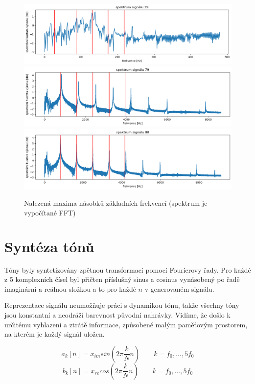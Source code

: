 \documentclass[a4paper, 12pt]{article}
\begin{document}
	\begin{figure}[H]
		\includegraphics[width=\textwidth]{src/base_a.png}
		\includegraphics[width=\textwidth]{src/base_b.png}
		\includegraphics[width=\textwidth]{src/base_c.png}
		\caption{Nalezená maxima násobků základních frekvencí (spektrum je vypočítané FFT)}
	\end{figure}
	
	\section{Syntéza tónů}
	Tóny byly syntetizovány zpětnou transformací pomocí Fourierovy řady. Pro každé z 5 komplexních čísel byl přičten příslušný sinus a cosinus vynásobený po řadě imaginární a reálnou složkou a to pro každé $n$ v generovaném signálu.
	
	Reprezentace signálu neumožňuje práci s dynamikou tónu, takže všechny tóny jsou konstantní a neodráží barevnost původní nahrávky. Vidíme, že došlo k určitému vyhlazení a ztrátě informace, způsobené malým paměťovým prostorem, na kterém je každý signál uložen.
	
	$$ a_k[n] = x_{im} sin(2 \pi \frac{k}{N} n) \qquad k = f_0, \dots, 5f_0$$
	$$ b_k[n] = x_{re} cos(2 \pi \frac{k}{N} n) \qquad k = f_0, \dots, 5f_0$$
	
\end{document}
